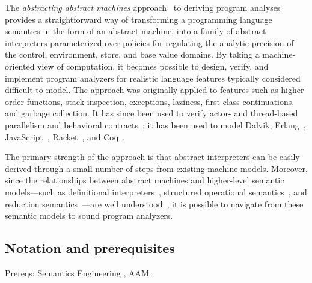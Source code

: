 \documentclass[preprint,onecolumn,9pt]{sigplanconf} %
\begin{document}
The \emph{abstracting abstract machines}
approach~\cite{dvanhorn:VanHorn2011Abstracting,dvanhorn:VanHorn2012Systematic}
to deriving program analyses provides a straightforward way of
transforming a programming language semantics in the form of an
abstract machine, into a family of abstract interpreters parameterized
over policies for regulating the analytic precision of the control,
environment, store, and base value domains.  By taking a
machine-oriented view of computation, it becomes possible to design,
verify, and implement program analyzers for realistic language
features typically considered difficult to model.  The approach was
originally applied to features such as higher-order functions,
stack-inspection, exceptions, laziness, first-class continuations, and
garbage collection.  It has since been used to verify actor-
\cite{local:DOsualdo:12A} and
thread-based~\cite{dvanhorn:Might2011Family} parallelism and
behavioral contracts~\cite{dvanhorn:TobinHochstadt2012Higherorder}; it
has been used to model Dalvik, Erlang~\cite{local:DOsualdo:12B},
JavaScript~\cite{local:DBLP:journals/corr/abs-1109-4467},
Racket~\cite{dvanhorn:TobinHochstadt2012Higherorder}, and
Coq~\cite{local:harvard}.

The primary strength of the approach is that abstract interpreters can
be easily derived through a small number of steps from existing
machine models.%
Moreover, since the relationships between abstract machines and
higher-level semantic models---such as definitional
interpreters~\cite{dvanhorn:reynolds-hosc98}, structured operational
semantics~\cite{dvanhorn:Plotkin1981Structural}, and reduction
semantics~\cite{dvanhorn:Felleisen2009Semantics}---are well
understood~\cite{dvanhorn:Danvy:DSc}, it is possible to navigate from
these semantic models to sound program analyzers.





\subsection{Notation and prerequisites}

Prereqs: Semantics Engineering \cite{dvanhorn:Felleisen2009Semantics},
AAM \cite{dvanhorn:VanHorn2011Abstracting}
\cite{dvanhorn:VanHorn2012Systematic}.
\end{document}
